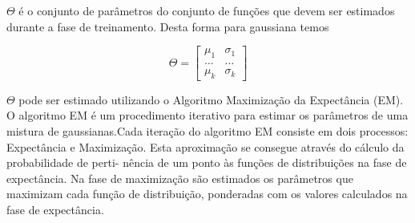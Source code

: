 \documentclass[ 
	article,			%
	11pt,				%
	oneside,			%
	a4paper,			%
	english,			%
	brazil,				%
	]{abntex2}
\begin{document}
$\Theta$ é o conjunto de parâmetros do conjunto de funções que devem ser
estimados durante a fase de treinamento. Desta forma para gaussiana temos

\begin{equation}
	\Theta=
	\begin{bmatrix}
		\mu_1 & \sigma_1 \\
		\ldots & \ldots \\
		\mu_k & \sigma_k 
	\end{bmatrix}
\end{equation}

$\Theta$ pode ser estimado utilizando o Algoritmo Maximização da Expectância
(EM). O algoritmo EM é um procedimento iterativo para estimar
os parâmetros de uma mistura de gaussianas.Cada iteração do algoritmo EM
consiste em dois processos: Expectância e Maximização.
Esta aproximação se consegue através do cálculo da probabilidade de perti-
nência de um ponto às funções de distribuições na fase de expectância. Na fase
de maximização são estimados os parâmetros que maximizam cada função de
distribuição, ponderadas com os valores calculados na fase de expectância.
\end{document}
